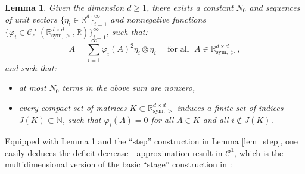 \documentclass[reqno,twoside,11pt]{amsart}
\newcommand{\sym}{\mathrm{sym}}
\newcommand{\R}{\mathbb{R}}
\numberwithin{equation}{section}
\theoremstyle{plain}
\newtheorem{lemma}[theorem]{Lemma}
\theoremstyle{definition}
\begin{document}
\begin{lemma}\label{lem_met_deco}
Given the dimension $d\geq 1$, there exists a constant $N_0$ and
sequences of unit vectors $\{\eta_i\in\R^d\}_{i=1}^\infty$ 
and nonnegative functions
$\{\varphi_i\in\mathcal{C}^\infty_c(\R^{d\times d}_{\sym, >},\R)\}_{i=1}^\infty$, such that:
$$ A = \sum_{i=1}^{\infty} \varphi_i(A)^2 \eta_i\otimes\eta_i \quad
\mbox{ for all } \; A\in \R^{d\times d}_{\sym, >},$$
and such that:
\begin{itemize} 
\item[(i)] at most $N_0$ terms in the above sum are nonzero,
\item[(ii)] every compact set of matrices $K\subset  \R^{d\times d}_{\sym, >}$ 
induces a finite set of indices $J(K)\subset\mathbb{N}$, such that
$\varphi_i(A)=0$ for all $A\in K$ and all $i\not\in J(K)$.
\end{itemize}
\end{lemma}

\medskip

\noindent Equipped with Lemma \ref{lem_met_deco} and the ``step''
construction in Lemma \ref{lem_step}, one easily deduces the
deficit decrease - approximation result in $\mathcal{C}^1$, which is
the multidimensional version of the basic ``stage'' construction in \cite[Proposition 3.2]{lewpak_MA}:
\end{document}
